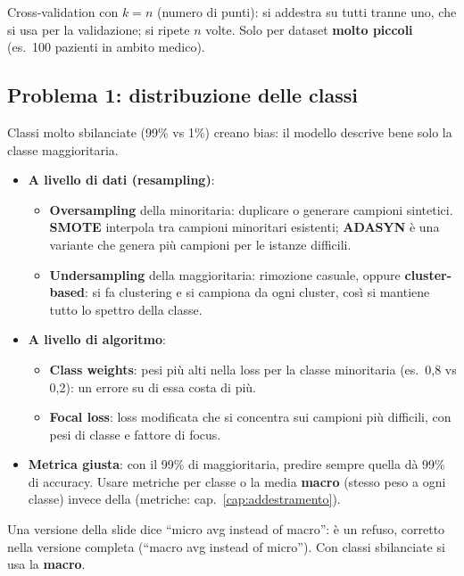 \begin{definizione}
Cross-validation con $k = n$ (numero di punti): si addestra su tutti tranne uno, che si usa per la validazione; si ripete
$n$ volte. Solo per dataset \textbf{molto piccoli} (es.\ 100 pazienti in ambito medico).
\end{definizione}

\subsection{Problema 1: distribuzione delle classi}
Classi molto sbilanciate (99\% vs 1\%) creano bias: il modello descrive bene solo la classe maggioritaria.
\begin{itemize}
  \item \textbf{A livello di dati (resampling)}:
  \begin{itemize}
    \item \textbf{Oversampling} della minoritaria: duplicare o generare campioni sintetici.
          \textbf{SMOTE} interpola tra campioni minoritari esistenti; \textbf{ADASYN} è una variante che genera più campioni
          per le istanze difficili.
    \item \textbf{Undersampling} della maggioritaria: rimozione casuale, oppure \textbf{cluster-based}: si fa clustering e si
          campiona da ogni cluster, così si mantiene tutto lo spettro della classe.
  \end{itemize}
  \item \textbf{A livello di algoritmo}:
  \begin{itemize}
    \item \textbf{Class weights}: pesi più alti nella loss per la classe minoritaria (es.\ 0,8 vs 0,2): un errore su di essa costa di più.
    \item \textbf{Focal loss}: loss modificata che si concentra sui campioni più difficili, con pesi di classe e fattore di focus.
  \end{itemize}
  \item \textbf{Metrica giusta}: con il 99\% di maggioritaria, predire sempre quella dà 99\% di accuracy. Usare metriche per classe o
        la media \textbf{macro} (stesso peso a ogni classe) invece della  (metriche: cap.~\ref{cap:addestramento}).
\end{itemize}
\begin{attenzione}
Una versione della slide dice ``micro avg instead of macro'': è un refuso, corretto nella versione completa
(``macro avg instead of micro''). Con classi sbilanciate si usa la \textbf{macro}.
\end{attenzione}

